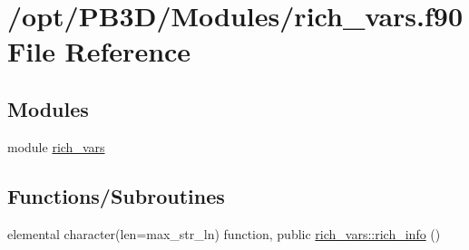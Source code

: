 \hypertarget{rich__vars_8f90}{}\section{/opt/\+P\+B3\+D/\+Modules/rich\+\_\+vars.f90 File Reference}
\label{rich__vars_8f90}
\subsection*{Modules}
\begin{DoxyCompactItemize}
\item 
module \hyperlink{namespacerich__vars}{rich\+\_\+vars}
\end{DoxyCompactItemize}
\subsection*{Functions/\+Subroutines}
\begin{DoxyCompactItemize}
\item 
elemental character(len=max\+\_\+str\+\_\+ln) function, public \hyperlink{namespacerich__vars_a4f54d3fc0ac510fc073220794ee4fa37}{rich\+\_\+vars\+::rich\+\_\+info} ()
\end{DoxyCompactItemize}
